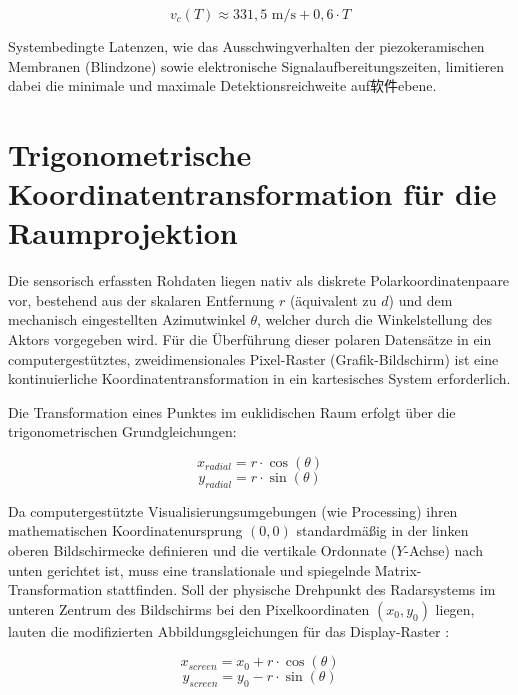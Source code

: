 \begin{equation}
	v_c(T) \approx 331{,}5 \text{ m/s} + 0{,}6 \cdot T
\end{equation}

Systembedingte Latenzen, wie das Ausschwingverhalten der piezokeramischen Membranen (Blindzone) sowie elektronische Signalaufbereitungszeiten, limitieren dabei die minimale und maximale Detektionsreichweite auf软件ebene.

\section{Trigonometrische Koordinatentransformation für die Raumprojektion}
\label{sec:Koordinatentransformation}

Die sensorisch erfassten Rohdaten liegen nativ als diskrete Polarkoordinatenpaare vor, bestehend aus der skalaren Entfernung $r$ (äquivalent zu $d$) und dem mechanisch eingestellten Azimutwinkel $\theta$, welcher durch die Winkelstellung des Aktors vorgegeben wird. Für die Überführung dieser polaren Datensätze in ein computergestütztes, zweidimensionales Pixel-Raster (Grafik-Bildschirm) ist eine kontinuierliche Koordinatentransformation in ein kartesisches System erforderlich.

Die Transformation eines Punktes im euklidischen Raum erfolgt über die trigonometrischen Grundgleichungen:

\begin{equation}
	x_{radial} = r \cdot \cos(\theta)
\end{equation}
\begin{equation}
	y_{radial} = r \cdot \sin(\theta)
\end{equation}

Da computergestützte Visualisierungsumgebungen (wie Processing) ihren mathematischen Koordinatenursprung $(0,0)$ standardmä\ss ig in der linken oberen Bildschirmecke definieren und die vertikale Ordonnate ($Y$-Achse) nach unten gerichtet ist, muss eine translationale und spiegelnde Matrix-Transformation stattfinden. Soll der physische Drehpunkt des Radarsystems im unteren Zentrum des Bildschirms bei den Pixelkoordinaten $(x_0, y_0)$ liegen, lauten die modifizierten Abbildungsgleichungen für das Display-Raster \cite{Parisi:2014}:

\begin{equation}
	x_{screen} = x_0 + r \cdot \cos(\theta)
\end{equation}
\begin{equation}
	y_{screen} = y_0 - r \cdot \sin(\theta)
\end{equation}

